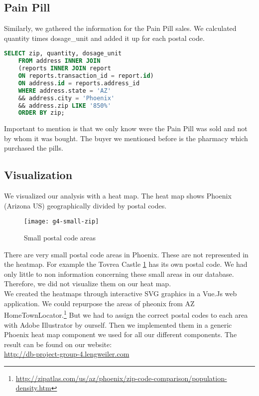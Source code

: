 \subsection*{Pain Pill}
Similarly, we gathered the information for the Pain Pill sales. We calculated quantity times dosage\_unit and added it up for each postal code.
\begin{lstlisting}[language=SQL]
    SELECT zip, quantity, dosage_unit 
    FROM address INNER JOIN 
    (reports INNER JOIN report 
    ON reports.transaction_id = report.id) 
    ON address.id = reports.address_id 
    WHERE address.state = 'AZ' 
    && address.city = 'Phoenix' 
    && address.zip LIKE '850%'
    ORDER BY zip;
\end{lstlisting}
Important to mention is that we only know were the Pain Pill was sold and not by whom it was bought. The buyer we mentioned before is the pharmacy which purchased the pills.

\subsection*{Visualization}
We visualized our analysis with a heat map. The heat map shows Phoenix (Arizona US) geographically divided by postal codes. 
\begin{figure}[H]
    \centering
    \texttt{[image: g4-small-zip]}
    \caption{Small postal code areas}
    \label{fig:zipArea}
\end{figure}
There are very small postal code areas in Phoenix. These are not represented in the heatmap. For example the Tovrea Castle \ref{fig:zipArea} has its own postal code. We had only little to non information concerning these small areas in our database. Therefore, we did not visualize them on our heat map.\\
We created the heatmaps through interactive SVG graphics in a Vue.Js web application. We could repurpose the areas of pheonix from AZ HomeTownLocator.\footnote{\url{http://zipatlas.com/us/az/phoenix/zip-code-comparison/population-density.htm}} But we had to assign the correct postal codes to each area with Adobe Illustrator by ourself. Then we implemented them in a generic Phoenix heat map component we used for all our different components. The result can be found on our website:\\
\url{http://db-project-group-4.lengweiler.com}


